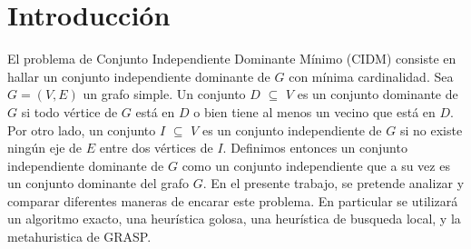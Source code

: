 \documentclass[a4paper]{article}
\begin{document}

\thispagestyle{empty}

\maketitle
\newpage

\thispagestyle{empty}
\vfill
%	
%

\thispagestyle{empty}
\vspace{1.5cm}
\tableofcontents
\newpage

 
\newpage
\section{Introducción}
El problema de Conjunto Independiente Dominante Mínimo (CIDM) consiste en hallar un conjunto independiente dominante de $G$ con mínima cardinalidad. Sea $G = (V, E)$ un grafo simple. Un conjunto $D$ $\subseteq$ $V$ es un conjunto dominante de $G$ si todo vértice de $G$ está en $D$ o bien tiene al menos un vecino que está en $D$. Por otro lado, un conjunto $I$ $\subseteq$ $V$ es un conjunto independiente de $G$ si no existe ningún eje de $E$ entre dos vértices de $I$. Definimos entonces un
conjunto independiente dominante de $G$ como un conjunto independiente que a su vez es un conjunto dominante del grafo $G$.
En el presente trabajo, se pretende analizar y comparar diferentes maneras de encarar este problema. En particular se utilizará un algoritmo exacto, una heurística golosa, una heurística de busqueda local, y la metahuristica de GRASP.
\end{document}
